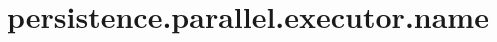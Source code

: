 \section{persistence.parallel.executor.name}
\label{configuration:PersistenceParallelExecutorName}
\TODO
